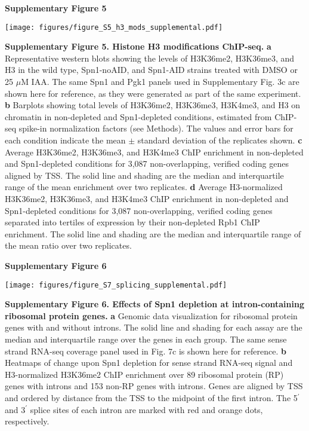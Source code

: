\documentclass[8pt]{extarticle}
\begin{document}
\newpage

\textbf{\large Supplementary Figure 5}

{\texttt{[image: figures/figure\_S5\_h3\_mods\_supplemental.pdf]}\par}

\vspace{2em}
\textbf{Supplementary Figure 5. Histone H3 modifications ChIP-seq.}
\textbf{a} Representative western blots showing the levels of H3K36me2, H3K36me3, and H3 in the wild type, Spn1-noAID, and Spn1-AID strains treated with DMSO or 25 $\mu$M IAA.
The same Spn1 and Pgk1 panels used in Supplementary Fig. 3c are shown here for reference, as they were generated as part of the same experiment.
\textbf{b} Barplots showing total levels of H3K36me2, H3K36me3, H3K4me3, and H3 on chromatin in non-depleted and Spn1-depleted conditions, estimated from ChIP-seq spike-in normalization factors (see Methods).
The values and error bars for each condition indicate the mean $\pm$ standard deviation of the replicates shown.
\textbf{c} Average H3K36me2, H3K36me3, and H3K4me3 ChIP enrichment in non-depleted and Spn1-depleted conditions for 3,087 non-overlapping, verified coding genes aligned by TSS.
The solid line and shading are the median and interquartile range of the mean enrichment over two replicates.
\textbf{d} Average H3-normalized H3K36me2, H3K36me3, and H3K4me3 ChIP enrichment in non-depleted and Spn1-depleted conditions for 3,087 non-overlapping, verified coding genes separated into tertiles of expression by their non-depleted Rpb1 ChIP enrichment.
The solid line and shading are the median and interquartile range of the mean ratio over two replicates.

\newpage




\textbf{\large Supplementary Figure 6}

{\texttt{[image: figures/figure\_S7\_splicing\_supplemental.pdf]}\par}

\vspace{2em}
\textbf{Supplementary Figure 6. Effects of Spn1 depletion at intron-containing ribosomal protein genes.}
\textbf{a} Genomic data visualization for ribosomal protein genes with and without introns.
The solid line and shading for each assay are the median and interquartile range over the genes in each group.
The same sense strand RNA-seq coverage panel used in Fig. 7c is shown here for reference.
\textbf{b} Heatmaps of change upon Spn1 depletion for sense strand RNA-seq signal and H3-normalized H3K36me2 ChIP enrichment over 89 ribosomal protein (RP) genes with introns and 153 non-RP genes with introns.
Genes are aligned by TSS and ordered by distance from the TSS to the midpoint of the first intron.
The 5$^\prime$ and 3$^\prime$ splice sites of each intron are marked with red and orange dots, respectively.

\end{document}
